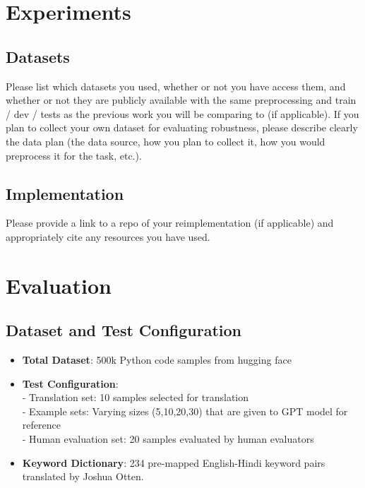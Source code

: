 \documentclass[11pt,a4paper]{article}
\begin{document}
\section{Experiments}

\subsection{Datasets}
Please list which datasets you used, whether or not you have access them, and whether or not they are publicly available with the same preprocessing and train / dev / tests as the previous work you will be comparing to (if applicable). If you plan to collect your own dataset for evaluating robustness, please describe clearly the data plan (the data source, how you plan to collect it, how you would preprocess it for the task, etc.).

\subsection{Implementation} 
Please provide a link to a repo of your reimplementation (if applicable) and appropriately cite any resources you have used.

\section{Evaluation}
\subsection{Dataset and Test Configuration}
\begin{itemize}[itemsep=0pt, topsep=0pt]
    \item \textbf{Total Dataset}: 500k Python code samples from hugging face \cite{jtatman2021python}
    \item \textbf{Test Configuration}:\\ 
    - Translation set: 10 samples selected for translation\\
    - Example sets: Varying sizes (5,10,20,30) that are given to GPT model for reference\\ 
    - Human evaluation set: 20 samples evaluated by human evaluators
    \item \textbf{Keyword Dictionary}: 234 pre-mapped English-Hindi keyword pairs translated by Joshua Otten.
\end{itemize}
\end{document}
